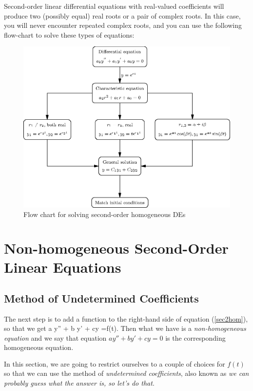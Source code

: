 \documentclass[12pt]{book}
\begin{document}
Second-order linear differential equations with real-valued
coefficients will produce two (possibly equal) real roots or a pair of
complex roots.  In this case, you will never encounter repeated
complex roots, and you can use the following flow-chart to solve these
types of equations:

\vspace{0.5in}
\begin{figure}[h]
  \centering
  \includegraphics{201/linhomflow}
  \caption{Flow chart for solving second-order homogeneous DEs}
  \label{fig:linhomflow}
\end{figure}


\chapter{Non-homogeneous Second-Order Linear Equations}

\section{Method of Undetermined Coefficients}
The next step is to add a function to the right-hand side of equation
(\ref{sec2hom}), so that we get
\bee
a y'' + b y' + cy =f(t).
\eee
Then what we have is a \emph{non-homogeneous equation} and we say that equation
$a y'' + b y' + cy =0$ is the corresponding homogeneous equation.

In this section, we are going to restrict ourselves to a couple of choices
for $f(t)$ so that we can use the method of \emph{undetermined coefficients},
also known as \emph{we can probably guess what the answer is, so let's do
that}.
\end{document}
